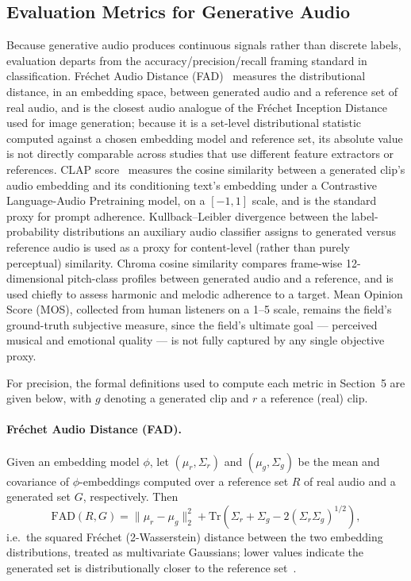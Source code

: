 \documentclass[11pt]{article}
\begin{document}
\subsection{Evaluation Metrics for Generative Audio}

Because generative audio produces continuous signals rather than discrete labels, evaluation departs from the accuracy/precision/recall framing standard in classification. Fr\'echet Audio Distance (FAD)~\cite{kilgour2019fad,gui2024fad} measures the distributional distance, in an embedding space, between generated audio and a reference set of real audio, and is the closest audio analogue of the Fr\'echet Inception Distance used for image generation; because it is a set-level distributional statistic computed against a chosen embedding model and reference set, its absolute value is not directly comparable across studies that use different feature extractors or references. CLAP score~\cite{wu2023clap} measures the cosine similarity between a generated clip's audio embedding and its conditioning text's embedding under a Contrastive Language-Audio Pretraining model, on a $[-1,1]$ scale, and is the standard proxy for prompt adherence. Kullback--Leibler divergence between the label-probability distributions an auxiliary audio classifier assigns to generated versus reference audio is used as a proxy for content-level (rather than purely perceptual) similarity. Chroma cosine similarity compares frame-wise 12-dimensional pitch-class profiles between generated audio and a reference, and is used chiefly to assess harmonic and melodic adherence to a target. Mean Opinion Score (MOS), collected from human listeners on a 1--5 scale, remains the field's ground-truth subjective measure, since the field's ultimate goal --- perceived musical and emotional quality --- is not fully captured by any single objective proxy.

For precision, the formal definitions used to compute each metric in Section~5 are given below, with $g$ denoting a generated clip and $r$ a reference (real) clip.

\paragraph{Fr\'echet Audio Distance (FAD).} Given an embedding model $\phi$, let $(\mu_r, \Sigma_r)$ and $(\mu_g, \Sigma_g)$ be the mean and covariance of $\phi$-embeddings computed over a reference set $R$ of real audio and a generated set $G$, respectively. Then
\begin{equation}
\mathrm{FAD}(R, G) = \lVert \mu_r - \mu_g \rVert_2^2 + \mathrm{Tr}\!\left(\Sigma_r + \Sigma_g - 2\left(\Sigma_r \Sigma_g\right)^{1/2}\right),
\label{eq:fad}
\end{equation}
i.e.\ the squared Fr\'echet (2-Wasserstein) distance between the two embedding distributions, treated as multivariate Gaussians; lower values indicate the generated set is distributionally closer to the reference set~\cite{gui2024fad}.
\end{document}
